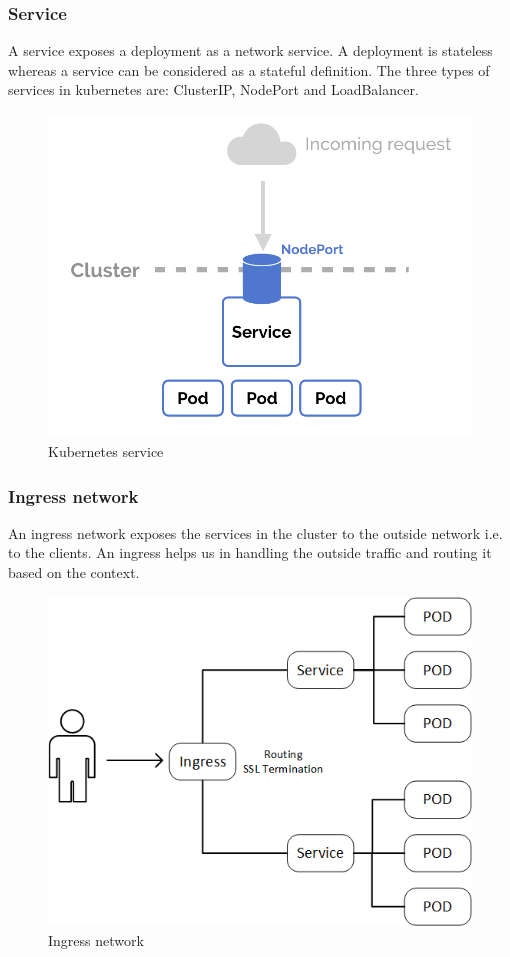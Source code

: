\documentclass[12pt]{article}
\begin{document}
\subsubsection{Service}
A service exposes a deployment as a network service. A deployment is stateless whereas a service can be considered as a stateful definition. The three types of services in kubernetes are: ClusterIP, NodePort and LoadBalancer.\\
\begin{figure}[h!]
	\begin{center}
		\includegraphics[totalheight=0.25\textheight]{service}
		\caption{Kubernetes service}
	\end{center}
\end{figure}
\subsubsection{Ingress network}
An ingress network exposes the services in the cluster to the outside network i.e. to the clients. An ingress helps us in handling the outside traffic and routing it based on the context.\\
\begin{figure}[h!]
	\begin{center}
		\includegraphics[totalheight=0.31\textheight]{ingress}
		\caption{Ingress network}
	\end{center}
\end{figure}
\end{document}
